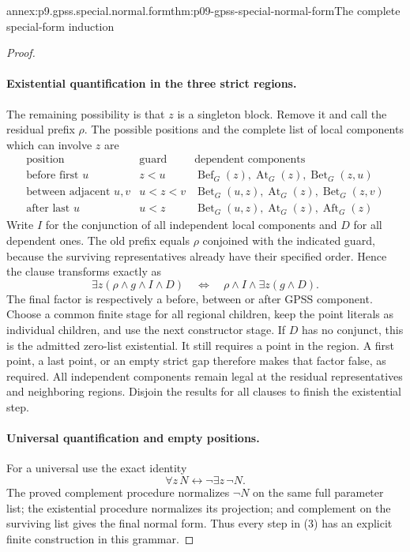 \begin{annexitem}{annex:p9.gpss.special.normal.form}{thm:p09-gpss-special-normal-form}{The complete special-form induction}
\begin{proof}
\paragraph{Existential quantification in the three strict regions.}
The remaining possibility is that \(z\) is a singleton
block. Remove it and call the residual prefix \(\rho\).
The possible positions and the complete list of local
components which can involve \(z\) are
\[
\begin{array}{c|c|l}
 \text{position}&\text{guard}&\text{dependent components}\\ \hline
 \text{before first }u&z<u&
   \operatorname{Bef}_G(z),\operatorname{At}_G(z),
                                      \operatorname{Bet}_G(z,u)\\
 \text{between adjacent }u,v&u<z<v&
   \operatorname{Bet}_G(u,z),\operatorname{At}_G(z),
                                      \operatorname{Bet}_G(z,v)\\
 \text{after last }u&u<z&
   \operatorname{Bet}_G(u,z),\operatorname{At}_G(z),
                                      \operatorname{Aft}_G(z)
\end{array}
\]
Write \(I\) for the conjunction of all independent local
components and \(D\) for all dependent ones. The old
prefix equals \(\rho\) conjoined with the indicated
guard, because the surviving representatives already have
their specified order. Hence the clause transforms exactly as
\[
 \exists z(\rho\land g\land I\land D)
       \quad\Longleftrightarrow\quad
                   \rho\land I\land\exists z(g\land D).
 \tag{2}
\]
The final factor is respectively a before, between or after
GPSS component. Choose a common finite stage for all regional
children, keep the point literals as individual children, and
use the next constructor stage. If \(D\) has no conjunct,
this is the admitted zero-list existential. It still requires
a point in the region. A first point, a last point, or an
empty strict gap therefore makes that factor false, as required.
All independent components remain legal at the residual
representatives and neighboring regions. Disjoin the results
for all clauses to finish the existential step.

\paragraph{Universal quantification and empty positions.}
For a universal use the exact identity
\[
                       \forall z\,N\longleftrightarrow
                                  \neg\exists z\,\neg N.
 \tag{3}
\]
The proved complement procedure normalizes \(\neg N\)
on the same full parameter list; the existential procedure
normalizes its projection; and complement on the surviving
list gives the final normal form. Thus every step in (3)
has an explicit finite construction in this grammar.


\end{proof}
\end{annexitem}

